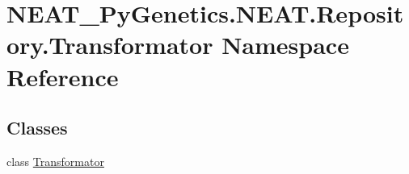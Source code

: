 \hypertarget{namespaceNEAT__PyGenetics_1_1NEAT_1_1Repository_1_1Transformator}{}\section{N\+E\+A\+T\+\_\+\+Py\+Genetics.\+N\+E\+A\+T.\+Repository.\+Transformator Namespace Reference}
\label{namespaceNEAT__PyGenetics_1_1NEAT_1_1Repository_1_1Transformator}
\subsection*{Classes}
\begin{DoxyCompactItemize}
\item 
class \hyperlink{classNEAT__PyGenetics_1_1NEAT_1_1Repository_1_1Transformator_1_1Transformator}{Transformator}
\end{DoxyCompactItemize}
